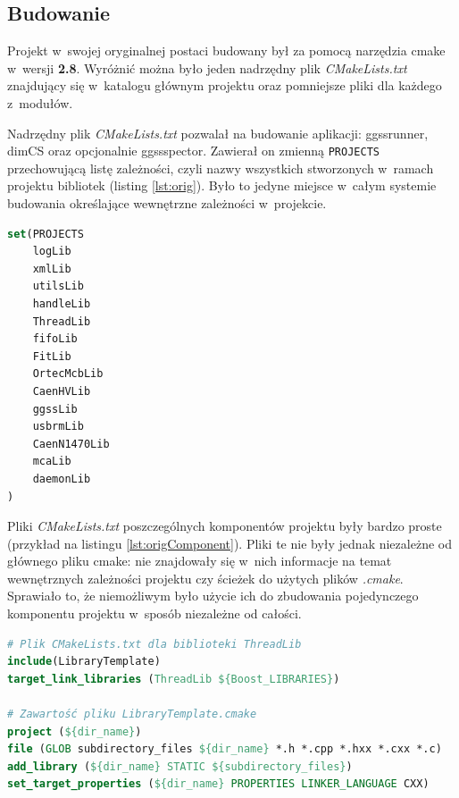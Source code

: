 \subsection{Budowanie} 
Projekt w~swojej oryginalnej postaci budowany był za pomocą narzędzia \gls*{cmake} w~wersji \textbf{2.8}. Wyróżnić można było jeden nadrzędny plik \textit{CMakeLists.txt} znajdujący się w~katalogu głównym projektu oraz pomniejsze pliki dla każdego z~modułów.

Nadrzędny plik \textit{CMakeLists.txt} pozwalał na budowanie aplikacji: ggssrunner, dimCS oraz opcjonalnie ggssspector. Zawierał on zmienną \lstinline{PROJECTS} przechowującą listę zależności, czyli nazwy wszystkich stworzonych w~ramach projektu bibliotek (listing \ref{lst:orig}). Było to jedyne miejsce w~całym systemie budowania określające wewnętrzne zależności w~projekcie.

\begin{lstlisting}[language=cmake, caption={Fragment oryginalnego pliku \textit{CMakeLists.txt} znajdującego się w~katalogu głównym pierwotnej wersji projektu przedstawiający zmienną \lstinline{PROJECTS} zawierającą listę bibliotek \cite{PluteckiMgr}}, label={lst:orig}]
set(PROJECTS
    logLib
    xmlLib
    utilsLib
    handleLib
    ThreadLib
    fifoLib
    FitLib
    OrtecMcbLib
    CaenHVLib
    ggssLib
    usbrmLib
    CaenN1470Lib
    mcaLib
    daemonLib
)
\end{lstlisting}

Pliki \textit{CMakeLists.txt} poszczególnych komponentów projektu były bardzo proste (przykład na listingu \ref{lst:origComponent}). Pliki te nie były jednak niezależne od głównego pliku \gls*{cmake}: nie znajdowały się w~nich informacje na temat wewnętrznych zależności projektu czy ścieżek do użytych plików \textit{.cmake}. Sprawiało to, że niemożliwym było użycie ich do zbudowania pojedynczego komponentu projektu w~sposób niezależne od całości. 

\begin{lstlisting}[language=cmake, caption={Oryginalny pliku \textit{CMakeLists.txt} służący do budowania biblioteki \textit{ThreadLib} oraz zawartość pliku \textit{LibraryTemplate.cmake} \cite{PluteckiMgr}}, label={lst:origComponent}]
# Plik CMakeLists.txt dla biblioteki ThreadLib
include(LibraryTemplate)
target_link_libraries (ThreadLib ${Boost_LIBRARIES})

# Zawartość pliku LibraryTemplate.cmake
project (${dir_name})
file (GLOB subdirectory_files ${dir_name} *.h *.cpp *.hxx *.cxx *.c)
add_library (${dir_name} STATIC ${subdirectory_files})
set_target_properties (${dir_name} PROPERTIES LINKER_LANGUAGE CXX)
\end{lstlisting}

